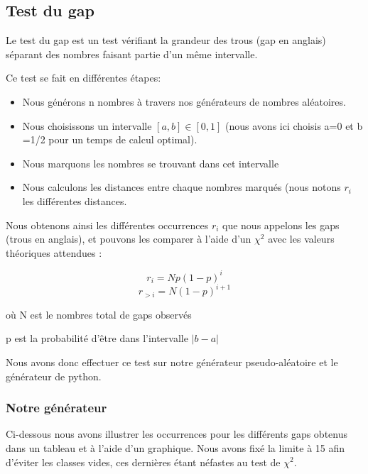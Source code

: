 \documentclass[10pt,a4paper]{article}
\begin{document}
	
\newpage
\subsection{Test du gap}
Le test du gap est un test vérifiant la grandeur des trous (gap en anglais) séparant des nombres faisant partie d'un même intervalle.

Ce test se fait en différentes étapes:
\begin{itemize}
\item Nous générons n nombres à travers nos générateurs de nombres aléatoires.
\item Nous choisissons un intervalle $[a,b]\in[0,1]$ (nous avons ici choisis a=0 et b =1/2 pour un temps de calcul optimal).
\item Nous marquons les nombres se trouvant dans cet intervalle
\item Nous calculons les distances entre chaque nombres marqués (nous notons $r_i$ les différentes distances. 
\end{itemize} 

Nous obtenons ainsi les différentes occurrences $r_i$ que nous appelons les gaps (trous en anglais), et pouvons les comparer à l'aide d'un $\chi^2$ avec les valeurs théoriques attendues :

\[
	r_i = N p (1-p)^i
\] 
\[
	r_{>i} = N (1-p)^{i+1}
\]

où N est le nombres total de gaps observés

p est la probabilité d'être dans l'intervalle $|b-a|$


Nous avons donc effectuer ce test sur notre générateur pseudo-aléatoire et le générateur de python.

	\subsubsection{Notre générateur}

Ci-dessous nous avons illustrer les occurrences pour les différents gaps obtenus dans un tableau et à l'aide d'un graphique. 
Nous avons fixé la limite à 15 afin d'éviter les classes vides, ces dernières étant néfastes au test de $\chi^2$.
\end{document}
